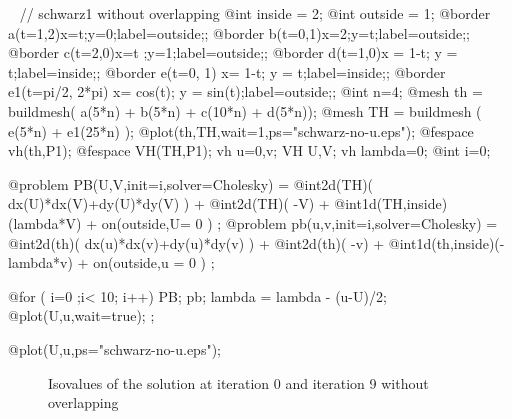 \documentclass[a4paper,twoside,12pt]{book}
\begin{document}
\begin{example}~
\bFF
// schwarz1 without overlapping
@int inside = 2;
@int outside = 1;
@border a(t=1,2){x=t;y=0;label=outside;};
@border b(t=0,1){x=2;y=t;label=outside;};
@border c(t=2,0){x=t ;y=1;label=outside;};
@border d(t=1,0){x = 1-t; y = t;label=inside;};
@border e(t=0, 1){ x= 1-t; y = t;label=inside;};
@border e1(t=pi/2, 2*pi){ x= cos(t); y = sin(t);label=outside;};
@int n=4;
@mesh th = buildmesh( a(5*n) + b(5*n) + c(10*n) + d(5*n));
@mesh TH = buildmesh ( e(5*n) + e1(25*n) );
@plot(th,TH,wait=1,ps="schwarz-no-u.eps");
@fespace vh(th,P1);
@fespace VH(TH,P1);
vh u=0,v; VH U,V;
vh lambda=0;
@int i=0;

@problem PB(U,V,init=i,solver=Cholesky) = 
    @int2d(TH)( dx(U)*dx(V)+dy(U)*dy(V) )
  + @int2d(TH)( -V) 
  + @int1d(TH,inside)(lambda*V) +    on(outside,U= 0 ) ;
@problem pb(u,v,init=i,solver=Cholesky) = 
    @int2d(th)( dx(u)*dx(v)+dy(u)*dy(v) )
  + @int2d(th)( -v) 
  + @int1d(th,inside)(-lambda*v) +    on(outside,u = 0 ) ;



@for ( i=0 ;i< 10; i++)
{
   PB;
   pb;
   lambda = lambda - (u-U)/2;
   @plot(U,u,wait=true);
};

@plot(U,u,ps="schwarz-no-u.eps");

\eFF
\end{example}

\begin{figure}[hbt]
\caption{  Isovalues of the solution at  iteration 0  and iteration 9 without overlapping }
\end{figure}
\end{document}
